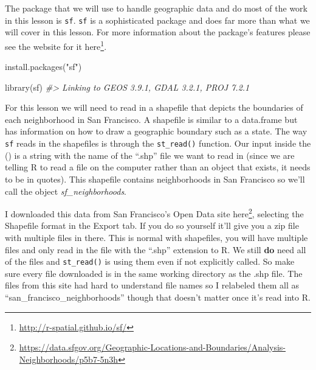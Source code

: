 \documentclass[
]{krantz}
\makeatletter
\newenvironment{Shaded}{\begin{snugshade}}{\end{snugshade}}
\newcommand{\CommentTok}[1]{\textcolor[rgb]{0.37,0.37,0.37}{\textit{#1}}}
\newcommand{\FunctionTok}[1]{\textcolor[rgb]{0,0,0}{#1}}
\newcommand{\NormalTok}[1]{#1}
\newcommand{\StringTok}[1]{\textcolor[rgb]{0.5,0.5,0.5}{#1}}
\renewcommand{\href}[2]{#2\footnote{\url{#1}}}
\newenvironment{kframe}{%
\medskip{}
\setlength{\fboxsep}{.8em}
 \def\at@end@of@kframe{}%
 \ifinner\ifhmode%
  \def\at@end@of@kframe{\end{minipage}}%
  \begin{minipage}{\columnwidth}%
 \fi\fi%
 \def\FrameCommand##1{\hskip\@totalleftmargin \hskip-\fboxsep
 \colorbox{shadecolor}{##1}\hskip-\fboxsep
     \hskip-\linewidth \hskip-\@totalleftmargin \hskip\columnwidth}%
 \MakeFramed {\advance\hsize-\width
   \@totalleftmargin\z@ \linewidth\hsize
   \@setminipage}}%
 {\par\unskip\endMakeFramed%
 \at@end@of@kframe}
\renewenvironment{Shaded}{\begin{kframe}}{\end{kframe}}
\makeatother
\begin{document}
The package that we will use to handle geographic data and do most of the work in this lesson is \texttt{sf}. \texttt{sf} is a sophisticated package and does far more than what we will cover in this lesson. For more information about the package's features please see the website for it \href{http://r-spatial.github.io/sf/}{here}.

\begin{Shaded}
\begin{Highlighting}[]
\FunctionTok{install.packages}\NormalTok{(}\StringTok{"sf"}\NormalTok{)}
\end{Highlighting}
\end{Shaded}

\begin{Shaded}
\begin{Highlighting}[]
\FunctionTok{library}\NormalTok{(sf)}
\CommentTok{\#\textgreater{} Linking to GEOS 3.9.1, GDAL 3.2.1, PROJ 7.2.1}
\end{Highlighting}
\end{Shaded}

For this lesson we will need to read in a shapefile that depicts the boundaries of each neighborhood in San Francisco. A shapefile is similar to a data.frame but has information on how to draw a geographic boundary such as a state. The way \texttt{sf} reads in the shapefiles is through the \texttt{st\_read()} function. Our input inside the () is a string with the name of the ``.shp'' file we want to read in (since we are telling R to read a file on the computer rather than an object that exists, it needs to be in quotes). This shapefile contains neighborhoods in San Francisco so we'll call the object \emph{sf\_neighborhoods}.

I downloaded this data from San Francisco's Open Data site \href{https://data.sfgov.org/Geographic-Locations-and-Boundaries/Analysis-Neighborhoods/p5b7-5n3h}{here}, selecting the Shapefile format in the Export tab. If you do so yourself it'll give you a zip file with multiple files in there. This is normal with shapefiles, you will have multiple files and only read in the file with the ``.shp'' extension to R. We still \textbf{do} need all of the files and \texttt{st\_read()} is using them even if not explicitly called. So make sure every file downloaded is in the same working directory as the .shp file. The files from this site had hard to understand file names so I relabeled them all as ``san\_francisco\_neighborhoods'' though that doesn't matter once it's read into R.
\end{document}
